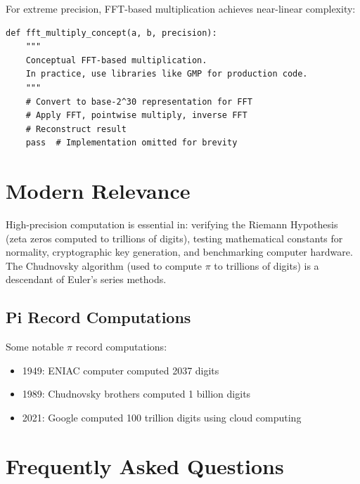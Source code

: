 For extreme precision, FFT-based multiplication achieves near-linear complexity:

\begin{lstlisting}[caption={FFT multiplication concept}, label=lst:fft_mul]
def fft_multiply_concept(a, b, precision):
    """
    Conceptual FFT-based multiplication.
    In practice, use libraries like GMP for production code.
    """
    # Convert to base-2^30 representation for FFT
    # Apply FFT, pointwise multiply, inverse FFT
    # Reconstruct result
    pass  # Implementation omitted for brevity
\end{lstlisting}

\section{Modern Relevance}

High-precision computation is essential in: verifying the Riemann Hypothesis (zeta zeros
computed to trillions of digits), testing mathematical constants for normality, cryptographic
key generation, and benchmarking computer hardware. The Chudnovsky algorithm (used to compute
$\pi$ to trillions of digits) is a descendant of Euler's series methods.

\subsection{Pi Record Computations}

Some notable $\pi$ record computations:
\begin{itemize}
\item 1949: ENIAC computer computed 2037 digits
\item 1989: Chudnovsky brothers computed 1 billion digits
\item 2021: Google computed 100 trillion digits using cloud computing
\end{itemize}

\section{Frequently Asked Questions}

